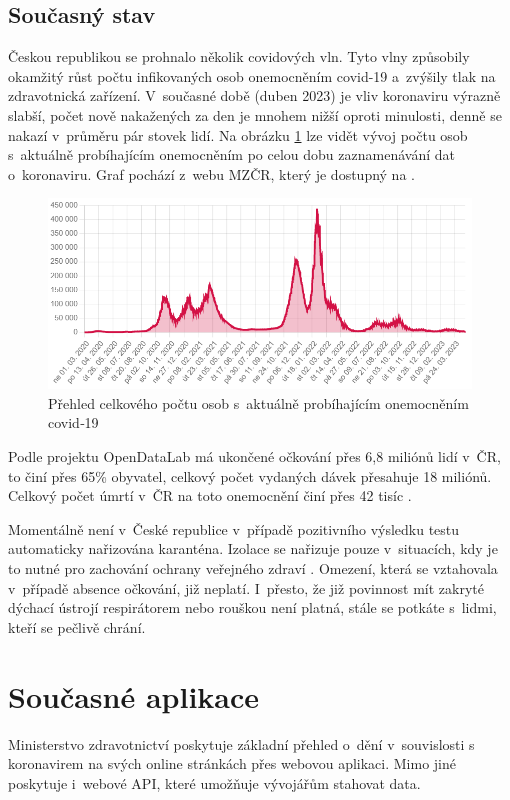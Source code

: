\clearpage

\subsection{Současný stav}
Českou republikou se prohnalo několik covidových vln. Tyto vlny způsobily okamžitý růst počtu infikovaných osob onemocněním covid-19 a~zvýšily tlak na zdravotnická zařízení. V~současné době (duben 2023) je vliv koronaviru výrazně slabší, počet nově nakažených za den je mnohem nižší oproti minulosti, denně se nakazí v~průměru pár stovek lidí. Na obrázku \ref{fig:SoucasnyCovid} lze vidět vývoj počtu osob s~aktuálně probíhajícím onemocněním po celou dobu zaznamenávání dat o~koronaviru. Graf pochází z~webu MZČR, který je dostupný na \cite{onemocneni-aktualne}.

\begin{figure}[h]
	\centering
	\includegraphics[width=1\textwidth]{Pictures/onemocneni.png}
	\caption{Přehled celkového počtu osob s~aktuálně probíhajícím onemocněním covid‑19\cite{onemocneni-aktualne}}
	\label{fig:SoucasnyCovid}
\end{figure}

Podle projektu OpenDataLab má ukončené očkování přes 6,8 miliónů lidí v~ČR, to činí přes 65\% obyvatel, celkový počet vydaných dávek přesahuje 18 miliónů. Celkový počet úmrtí v~ČR na toto onemocnění činí přes 42 tisíc \cite{soucasnystav-covid-statistika}.

Momentálně není v~České republice v~případě pozitivního výsledku testu automaticky nařizována karanténa. Izolace se nařizuje pouze v~situacích, kdy je to nutné pro zachování ochrany veřejného zdraví \cite{dopady-covid-izolace}. Omezení, která se vztahovala v~případě absence očkování, již neplatí. I~přesto, že již povinnost mít zakryté dýchací ústrojí respirátorem nebo rouškou není platná, stále se potkáte s~lidmi, kteří se pečlivě chrání.

\section{Současné aplikace}
\label{existing-apps}
Ministerstvo zdravotnictví poskytuje základní přehled o~dění v~souvislosti s koronavirem na svých online stránkách přes webovou aplikaci. Mimo jiné poskytuje i~webové API, které umožňuje vývojářům stahovat data.

